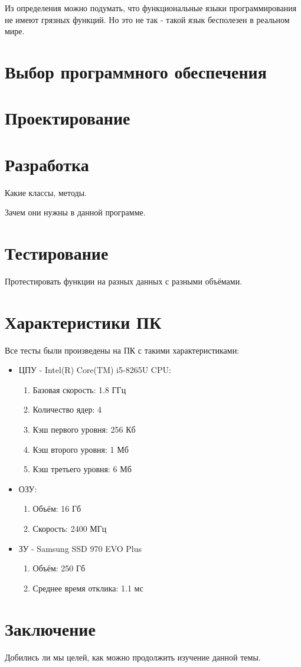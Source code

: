 Из определения можно подумать, что функциональные языки программирования не имеют грязных функций. 
Но это не так - такой язык бесполезен в реальном мире.

\newpage
\section{Выбор программного обеспечения}

\newpage
\section{Проектирование}

\newpage
\section{Разработка}

Какие классы, методы.

Зачем они нужны в данной программе.

\newpage
\section{Тестирование}

Протестировать функции на разных данных с разными объёмами.

\newpage
\section{Характеристики ПК}

Все тесты были произведены на ПК с такими характеристиками:

\begin{itemize}
	\item ЦПУ - Intel(R) Core(TM) i5-8265U CPU:
	\begin{enumerate}
		\item Базовая скорость: 1.8 ГГц
		\item Количество ядер: 4
		\item Кэш первого уровня: 256 Кб
		\item Кэш второго уровня: 1 Мб
		\item Кэш третьего уровня: 6 Мб
	\end{enumerate}
	\item ОЗУ:
	\begin{enumerate}
		\item Объём: 16 Гб
		\item Скорость: 2400 МГц
	\end{enumerate}
	\item ЗУ - Samsung SSD 970 EVO Plus
	\begin{enumerate}
		\item Объём: 250 Гб
		\item Среднее время отклика: 1.1 мс
	\end{enumerate}
\end{itemize}

\newpage
\section*{Заключение}
Добились ли мы целей, как можно продолжить изучение данной темы.
